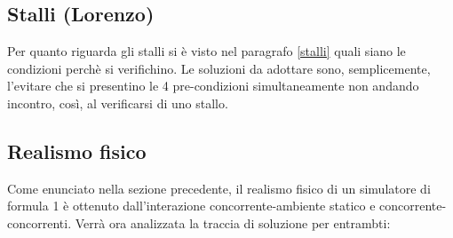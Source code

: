 \subsection{Stalli (Lorenzo)}
Per quanto riguarda gli stalli si \`{e} visto nel paragrafo \ref{stalli} quali siano le condizioni perch\`{e} si verifichino. Le soluzioni da adottare sono, semplicemente, l'evitare che si presentino le 4 pre-condizioni simultaneamente non andando incontro, cos\`{i}, al verificarsi di uno stallo.
\subsection{Realismo fisico}
Come enunciato nella sezione precedente, il realismo fisico di un simulatore di formula 1 è ottenuto dall'interazione
concorrente-ambiente statico e concorrente-concorrenti. Verrà ora analizzata la traccia di soluzione per entrambti:
